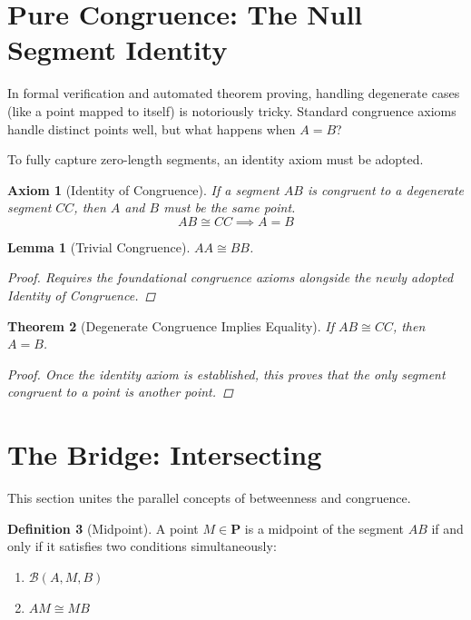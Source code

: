 \documentclass[12pt, letterpaper]{article}
\newtheorem{theorem}{Theorem}[section]
\newtheorem{lemma}[theorem]{Lemma}
\newtheorem{axiom}{Axiom}
\theoremstyle{definition}
\newtheorem{definition}[theorem]{Definition}
\newcommand{\B}{\mathcal{B}}
\newcommand{\Pset}{\mathbf{P}}
\begin{document}
\section{Pure Congruence: The Null Segment Identity}
In formal verification and automated theorem proving, handling degenerate cases (like a point mapped to itself) is notoriously tricky. Standard congruence axioms handle distinct points well, but what happens when $A=B$?

To fully capture zero-length segments, an identity axiom must be adopted.

\begin{axiom}[Identity of Congruence]
    If a segment $AB$ is congruent to a degenerate segment $CC$, then $A$ and $B$ must be the same point.
    \[ AB \cong CC \implies A=B \]
\end{axiom}

\begin{lemma}[Trivial Congruence]
    $AA \cong BB$.
    \begin{proof}
        Requires the foundational congruence axioms alongside the newly adopted Identity of Congruence.
    \end{proof}
\end{lemma}

\begin{theorem}[Degenerate Congruence Implies Equality]
    If $AB \cong CC$, then $A = B$.
    \begin{proof}
        Once the identity axiom is established, this proves that the only segment congruent to a point is another point.
    \end{proof}
\end{theorem}

\section{The Bridge: Intersecting }
This section unites the parallel concepts of betweenness and congruence.

\begin{definition}[Midpoint]
    A point $M \in \Pset$ is a midpoint of the segment $AB$ if and only if it satisfies two conditions simultaneously:
    \begin{enumerate}
        \item $\B(A, M, B)$
        \item $AM \cong MB$
    \end{enumerate}
\end{definition}
\end{document}
